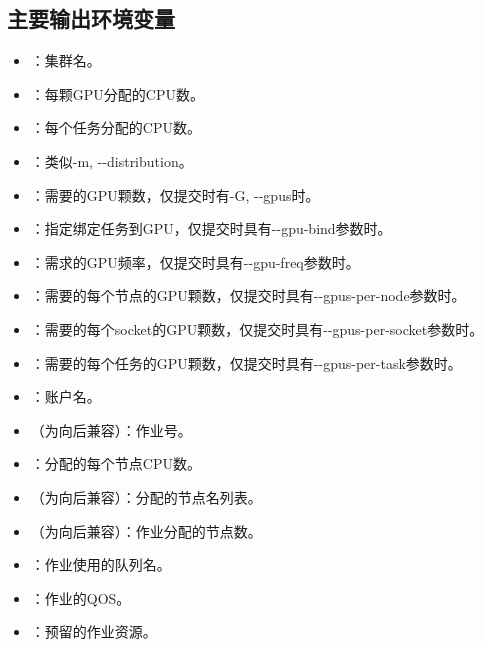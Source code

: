 \subsection{主要输出环境变量}
\begin{itemize}
	\item {}：集群名。
	\item {}：每颗GPU分配的CPU数。
	\item {}：每个任务分配的CPU数。
	\item {}：类似-m, -{}-distribution。
	\item {}：需要的GPU颗数，仅提交时有-G, -{}-gpus时。
	\item {}：指定绑定任务到GPU，仅提交时具有-{}-gpu-bind参数时。
	\item {}：需求的GPU频率，仅提交时具有-{}-gpu-freq参数时。
	\item {}：需要的每个节点的GPU颗数，仅提交时具有-{}-gpus-per-node参数时。
	\item {}：需要的每个socket的GPU颗数，仅提交时具有-{}-gpus-per-socket参数时。
	\item {}：需要的每个任务的GPU颗数，仅提交时具有-{}-gpus-per-task参数时。
	\item {}：账户名。
	\item {}（为向后兼容）：作业号。
	\item {}：分配的每个节点CPU数。
	\item {}（为向后兼容）：分配的节点名列表。
	\item {}（为向后兼容）：作业分配的节点数。
	\item {}：作业使用的队列名。
	\item {}：作业的QOS。
	\item {}：预留的作业资源。

\end{itemize}
